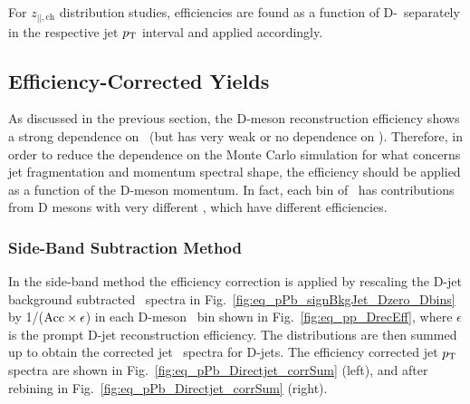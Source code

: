
For $z_{||,\text{ch}}$ distribution studies, efficiencies are found as a function of D-\pt\ separately in the respective jet $p_{\text T}$ interval and applied accordingly. 

\subsection{Efficiency-Corrected Yields}

As discussed in the previous section, the D-meson reconstruction efficiency shows a strong dependence on \ptd\ (but has very weak or no dependence on \ptjet).
Therefore, in order to reduce the dependence on the Monte Carlo simulation for what concerns jet fragmentation and momentum spectral shape,
the efficiency should be applied as a function of the D-meson momentum. In fact, each bin of \ptjet\ has contributions from D mesons with very different \ptd, which have different efficiencies.

\subsubsection{Side-Band Subtraction Method}
In the side-band method the efficiency correction is applied by rescaling the D-jet background subtracted \pt\ spectra in Fig.~\ref{fig:eq_pPb_signBkgJet_Dzero_Dbins}
by 1/(${\rm Acc} \times \epsilon$) in each D-meson \pt\ bin shown in Fig.~\ref{fig:eq_pp_DrecEff}, where $\epsilon$ is the prompt D-jet reconstruction efficiency.
The distributions are then summed up to obtain the corrected jet \pt\ spectra for D-jets. 
The efficiency corrected jet $p_{\text T}$ spectra are shown in Fig.~\ref{fig:eq_pPb_Directjet_corrSum} (left), and after rebining in Fig.~\ref{fig:eq_pPb_Directjet_corrSum} (right).

